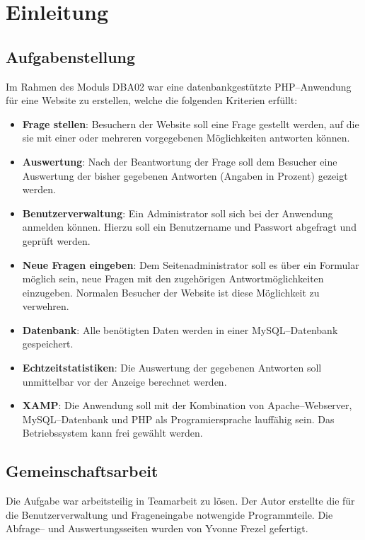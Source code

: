 \section{Einleitung}
\subsection{Aufgabenstellung}

Im Rahmen des Moduls DBA02 war eine datenbankgestützte PHP--Anwendung für eine Website zu erstellen, welche die folgenden Kriterien erfüllt:

\begin{itemize}
\item \textbf{Frage stellen}: Besuchern der Website soll eine Frage gestellt werden, auf die sie mit einer oder mehreren vorgegebenen Möglichkeiten antworten können.
\item \textbf{Auswertung}: Nach der Beantwortung der Frage soll dem Besucher eine Auswertung der bisher gegebenen Antworten (Angaben in Prozent) gezeigt werden.
\item \textbf{Benutzerverwaltung}: Ein Administrator soll sich bei der Anwendung anmelden können. Hierzu soll ein Benutzername und Passwort abgefragt und geprüft werden.
\item \textbf{Neue Fragen eingeben}: Dem Seitenadministrator soll es über ein Formular möglich sein, neue Fragen mit den zugehörigen Antwortmöglichkeiten einzugeben. Normalen Besucher der Website ist diese Möglichkeit zu verwehren.  
\item \textbf{Datenbank}: Alle benötigten Daten werden in einer MySQL--Datenbank gespeichert.
\item \textbf{Echtzeitstatistiken}: Die Auswertung der gegebenen Antworten soll unmittelbar vor der Anzeige berechnet werden.
\item \textbf{XAMP}: Die Anwendung soll mit der Kombination von Apache--Webserver, MySQL--Datenbank und PHP als Programiersprache lauffähig sein. Das Betriebssystem kann frei gewählt werden. 
\end{itemize}


\subsection{Gemeinschaftsarbeit}

Die Aufgabe war arbeitsteilig in Teamarbeit zu lösen. Der Autor erstellte die für die Benutzerverwaltung und Frageneingabe notwengide Programmteile. Die Abfrage-- und Auswertungsseiten wurden von Yvonne Frezel gefertigt.

